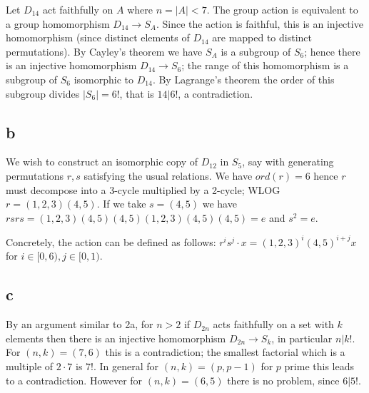 \documentclass{article}
\begin{document}
Let $D_{14}$ act faithfully on $A$ where $n = |A| < 7$. The group action is equivalent to a group homomorphism $D_{14} \to S_A$. Since the action is faithful, this is an injective homomorphism (since distinct elements of $D_{14}$ are mapped to distinct permutations). By Cayley's theorem we have $S_A$ is a subgroup of $S_6$; hence there is an injective homomorphism $D_{14} \to S_6$; the range of this homomorphism is a subgroup of $S_6$ isomorphic to $D_{14}$. By Lagrange's theorem the order of this subgroup divides $|S_6| = 6!$, that is $14 | 6!$, a contradiction.

\subsection*{b}

We wish to construct an isomorphic copy of $D_{12}$ in $S_5$, say with generating permutations $r, s$ satisfying the usual relations. We have $ord(r) = 6$ hence $r$ must decompose into a 3-cycle multiplied by a 2-cycle; WLOG $r = (1,2,3)(4, 5)$. If we take $s = (4, 5)$ we have $rsrs = (1,2,3)(4, 5)(4, 5)(1,2,3)(4, 5)(4, 5) = e$ and $s^2 = e$.

Concretely, the action can be defined as follows: $r^i s^j \cdot x = (1, 2, 3)^i(4, 5)^{i+j}x$ for $i \in [0, 6), j \in [0, 1)$.

\subsection*{c}

By an argument similar to 2a, for $n > 2$ if $D_{2n}$ acts faithfully on a set with $k$ elements then there is an injective homomorphism $D_{2n} \to S_k$, in particular $n | k!$. For $(n, k) = (7, 6)$ this is a contradiction; the smallest factorial which is a multiple of $2 \cdot 7$ is $7!$. In general for $(n, k) = (p, p-1)$ for $p$ prime this leads to a contradiction. However for $(n, k) = (6, 5)$ there is no problem, since $6 | 5!$.




\end{document}
